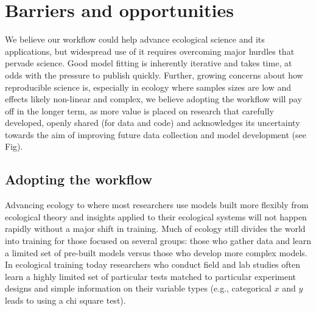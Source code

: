 \documentclass[11pt]{article}
\begin{document}
\section{Barriers and opportunities}

We believe our workflow could help advance ecological science and its applications, but widespread use of it requires overcoming major hurdles that pervade science.  
Good model fitting is inherently iterative and takes time, at odds with the pressure to publish quickly.
Further, growing concerns about how reproducible science is, especially in ecology where samples sizes are low and effects likely non-linear and complex, we believe adopting the workflow will pay off in the longer term, as more value is placed on research that carefully developed, openly shared (for data and code) and acknowledges its uncertainty towards the aim of improving future data collection and model development (see Fig). 

\subsection{Adopting the workflow}

Advancing ecology to where most researchers use models built more flexibly from ecological theory and insights applied to their ecological systems will not happen rapidly without a major shift in training. Much of ecology still divides the world into training for those focused on several groups: those who gather data and learn a limited set of pre-built models versus those who develop more complex models. In ecological training today researchers who conduct field and lab studies often learn a highly limited set of particular tests matched to particular experiment designs and simple information on their variable types (e.g., categorical $x$ and $y$ leads to using a chi square test). 
\end{document}
